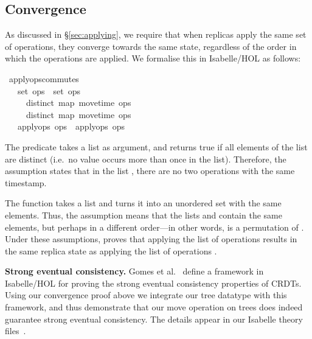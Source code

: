 \documentclass[10pt,journal,compsoc]{IEEEtran}
\renewenvironment{isabelle}{%
  \medbreak\indent%
  \renewcommand{\isanewline}{\\}%
  \begin{minipage}{\columnwidth}%
  \begin{isabellebody}%
  \begin{tabbing}%
}{%
  \end{tabbing}%
  \end{isabellebody}%
  \end{minipage}%
  \medbreak%
}
\renewcommand{\isacartoucheopen}{}
\renewcommand{\isacartoucheclose}{}
\begin{document}
\subsection{Convergence}\label{sec:convergence}

As discussed in \S\ref{sec:applying}, we require that when replicas apply the same set of operations, they converge towards the same state, regardless of the order in which the operations are applied.
We formalise this in Isabelle/HOL as follows:
\begin{isabelle}
\isamarkupfalse%
\ apply{\isacharunderscore}ops{\isacharunderscore}commutes{\isacharcolon}\isanewline
\ \ \ {\isacartoucheopen}set\ ops{}\ {\isacharequal}\ set\ ops{}{\isacartoucheclose}\isanewline
\ \ \ \ \ {\isacartoucheopen}distinct\ {\isacharparenleft}map\ move{\isacharunderscore}time\ ops{}{\isacharparenright}{\isacartoucheclose}\isanewline
\ \ \ \ \ {\isacartoucheopen}distinct\ {\isacharparenleft}map\ move{\isacharunderscore}time\ ops{}{\isacharparenright}{\isacartoucheclose}\isanewline
\ \ \ {\isacartoucheopen}apply{\isacharunderscore}ops\ ops{}\ {\isacharequal}\ apply{\isacharunderscore}ops\ ops{}{\isacartoucheclose}
\end{isabelle}

The predicate  takes a list as argument, and returns true if all elements of the list are distinct (i.e.\ no value occurs more than once in the list).
Therefore, the assumption  states that in the list , there are no two operations with the same timestamp.

The function  takes a list and turns it into an unordered set with the same elements.
Thus, the assumption  means that the lists  and  contain the same elements, but perhaps in a different order---in other words,  is a permutation of .
Under these assumptions,  proves that applying the list of operations  results in the same replica state as applying the list of operations .

\smallbreak\noindent\textbf{Strong eventual consistency.}
Gomes et al.~\cite{Gomes:2017gy} define a framework in Isabelle/HOL for proving the strong eventual consistency properties of CRDTs.
Using our convergence proof above we integrate our tree datatype with this framework, and thus demonstrate that our move operation on trees does indeed guarantee strong eventual consistency.
The details appear in our Isabelle theory files~\cite{SourceFiles}.
\end{document}
